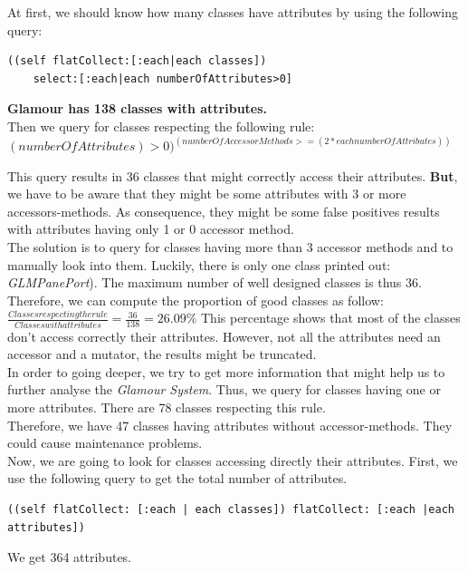 \documentclass[11pt,a4paper]{article}
\begin{document}
At first, we should know how many classes have attributes by using the following query:\\
\begin{lstlisting}
((self flatCollect:[:each|each classes])
	select:[:each|each numberOfAttributes>0]
\end{lstlisting}
\textbf{Glamour has 138 classes with attributes.}\\
Then we query for classes respecting the following rule:\\
$(numberOfAttributes) > 0) ^ (numberOfAccessorMethods >= (2*each numberOfAttributes))$

This query results in 36 classes that might correctly access their attributes. \textbf{But}, we have to be aware that they might be some attributes with 3 or more accessors-methods. As consequence, they might be some false positives results with attributes having only 1 or 0 accessor method.\\ 

The solution is to query for classes having more than 3 accessor methods and to manually look into them. Luckily, there is only one class printed out:  \textit{GLMPanePort}). The maximum number of well designed classes is thus 36.\\

Therefore, we can compute the proportion of good classes as follow: $\frac{Classes respecting the rule}{Classes with attributes} = \frac{36}{138} = 26.09\%$
 This percentage shows that most of the classes don't access correctly their attributes. However, not all the attributes need an accessor and a mutator, the results might be truncated.\\ 

In order to going deeper, we try to get more information that might help us to further analyse the \textit{Glamour System}. Thus, we query for classes having one or more attributes. There are 78 classes respecting this rule.\\

Therefore, we have 47 classes having attributes without accessor-methods. They could cause maintenance problems.\\

Now, we are going to look for classes accessing directly their attributes. First, we use the following query to get the total number of attributes.
\begin{lstlisting}
((self flatCollect: [:each | each classes]) flatCollect: [:each |each attributes])
\end{lstlisting}
We get 364 attributes.
\end{document}
